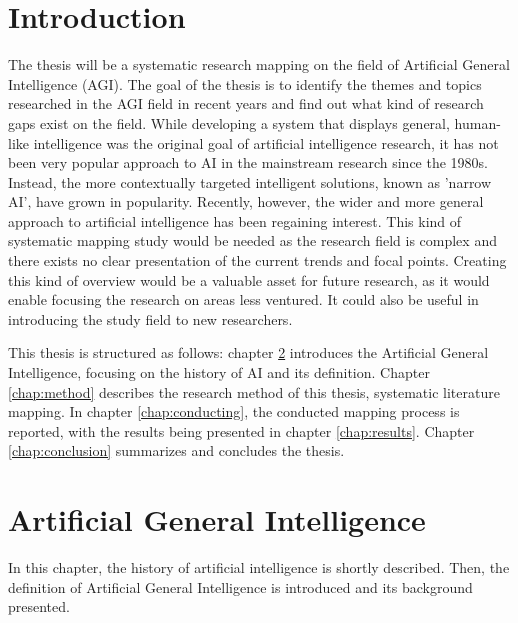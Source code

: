\documentclass[utf8,english]{gradu3}
\begin{document}
\maketitle

\mainmatter

\chapter{Introduction}
The thesis will be a systematic research mapping on the field of Artificial
General Intelligence (AGI). The goal of the thesis is to identify the themes and
topics researched in the AGI field in recent years and find out what kind of
research gaps exist on the field. While developing a system that displays
general, human-like intelligence was the original goal of artificial
intelligence research, it has not been very popular approach to AI in the
mainstream research since the 1980s. Instead, the more contextually targeted
intelligent solutions, known as 'narrow AI', have grown in popularity. Recently,
however, the wider and more general approach to artificial intelligence has been
regaining interest. This kind of systematic mapping study would be needed as the
research field is complex and there exists no clear presentation of the current
trends and focal points. Creating this kind of overview would be a valuable
asset for future research, as it would enable focusing the research on areas
less ventured. It could also be useful in introducing the study field to new
researchers.

This thesis is structured as follows: chapter \ref{chap:agi} introduces the
Artificial General Intelligence, focusing on the history of AI and its
definition. Chapter \ref*{chap:method} describes the research method of this
thesis, systematic literature mapping. In chapter \ref*{chap:conducting}, the
conducted mapping process is reported, with the results being presented in
chapter \ref*{chap:results}. Chapter \ref{chap:conclusion} summarizes and
concludes the thesis.

\chapter{Artificial General Intelligence}
\label{chap:agi}

In this chapter, the history of artificial intelligence is shortly described.
Then, the definition of Artificial General Intelligence is introduced and its
background presented.
\end{document}
